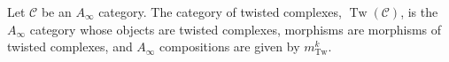 
 
 
Let $\mathcal C$ be an $A_\infty$ category. The category of twisted complexes, $\operatorname{Tw}(\mathcal C)$, is the $A_\infty$ category whose objects are twisted complexes, morphisms are morphisms of twisted complexes, and $A_\infty$ compositions are given by $m^k_{\operatorname{Tw}}$.

 